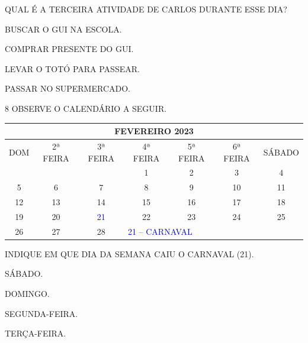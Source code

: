 QUAL É A TERCEIRA ATIVIDADE DE CARLOS DURANTE ESSE DIA?

\begin{escolha}[itemsep=0pt]
\item BUSCAR O GUI NA ESCOLA.

\item COMPRAR PRESENTE DO GUI.

\item LEVAR O TOTÓ PARA PASSEAR.

\item PASSAR NO SUPERMERCADO.
\end{escolha}

\pagebreak
\num{8} OBSERVE O CALENDÁRIO A SEGUIR.\bigskip

\begin{table}\footnotesize
\begin{tabular}{|ccccccc|}
\hline
\multicolumn{7}{|c|}{FEVEREIRO 2023} \\ \hline
\multicolumn{1}{|c|}{DOM} & \multicolumn{1}{c|}{2ª FEIRA} & \multicolumn{1}{c|}{3ª FEIRA} & \multicolumn{1}{c|}{4ª FEIRA} & \multicolumn{1}{c|}{5ª FEIRA} & \multicolumn{1}{c|}{6ª FEIRA} & SÁBADO \\ \hline
\multicolumn{1}{|c|}{} & \multicolumn{1}{c|}{} & \multicolumn{1}{c|}{} & \multicolumn{1}{c|}{1} & \multicolumn{1}{c|}{2} & \multicolumn{1}{c|}{3} & 4 \\ \hline
\multicolumn{1}{|c|}{5} & \multicolumn{1}{c|}{6} & \multicolumn{1}{c|}{7} & \multicolumn{1}{c|}{8} & \multicolumn{1}{c|}{9} & \multicolumn{1}{c|}{10} & 11 \\ \hline
\multicolumn{1}{|c|}{12} & \multicolumn{1}{c|}{13} & \multicolumn{1}{c|}{14} & \multicolumn{1}{c|}{15} & \multicolumn{1}{c|}{16} & \multicolumn{1}{c|}{17} & 18 \\ \hline
\multicolumn{1}{|c|}{19} & \multicolumn{1}{c|}{20} & \multicolumn{1}{c|}{\textcolor{blue}{21}} & \multicolumn{1}{c|}{22} & \multicolumn{1}{c|}{23} & \multicolumn{1}{c|}{24} & 25 \\ \hline
\multicolumn{1}{|c|}{26} & \multicolumn{1}{c|}{27} & \multicolumn{1}{c|}{28} & \multicolumn{4}{l|}{\textcolor{blue}{21 -- CARNAVAL}} \\ \hline
\end{tabular}\bigskip
\end{table}

INDIQUE EM QUE DIA DA SEMANA CAIU O CARNAVAL (21).

\begin{escolha}[itemsep=0pt]
\item SÁBADO.

\item DOMINGO.

\item SEGUNDA-FEIRA.

\item TERÇA-FEIRA.
\end{escolha}

